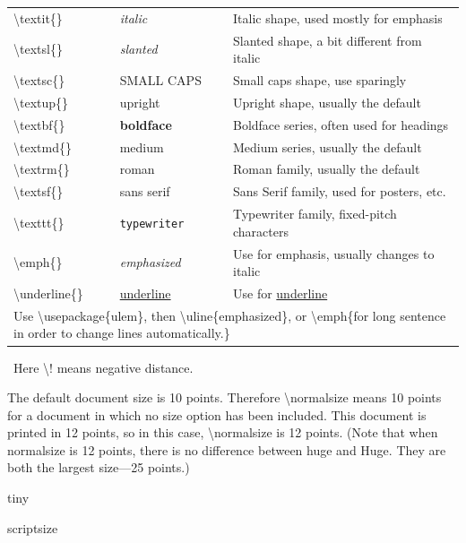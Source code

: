 \documentclass[12pt,openright]{book}
\begin{document}
\begin{center}
\begin{tabular}{|p{}p{}p{}|}
  \hline
  \textbackslash textit\{\} & \textit{italic} & Italic shape, used mostly for emphasis\\
  \textbackslash textsl\{\} & \textsl{slanted} & Slanted shape, a bit different from italic\\
  \textbackslash textsc\{\} & \textsc{SMALL CAPS} & Small caps shape, use sparingly\\
  \textbackslash textup\{\} & \textup{upright} & Upright shape, usually the default\\
  \textbackslash textbf\{\} & \textbf{boldface} & Boldface series, often used for headings\\
  \textbackslash textmd\{\} & \textmd{medium} & Medium series, usually the default\\
  \textbackslash textrm\{\} & \textrm{roman} & Roman family, usually the default\\
  \textbackslash textsf\{\} & \textsf{sans serif} & Sans Serif family, used for posters, etc.\\	
  \textbackslash texttt\{\} & \texttt{typewriter} & Typewriter family, fixed-pitch characters\\
  \textbackslash emph\{\} & \emph{emphasized} & Use for emphasis, usually changes to italic\\
  \textbackslash underline\{\} & \underline{underline} & Use for \underline{underline}\\
  \hline	
  \multicolumn{3}{p{0.9\textwidth}}{Use \textbackslash usepackage\{ulem\}, then \textbackslash uline\{emphasized\}, or \textbackslash emph\{for long sentence in order to change lines automatically.\}}
\end{tabular}
\end{center}

\dag\!\dag \, Here \textbackslash ! means negative distance. \dag\!\dag

The default document size is 10 points. Therefore \textbackslash normalsize means 10 points for a document in which no size option has been included. This document is printed in 12 points, so in this case, \textbackslash normalsize is 12 points. (Note that when normalsize is 12 points, there is no difference between huge and Huge. They are both the largest size—25 points.)

{\tiny tiny}

{\scriptsize scriptsize}
\end{document}
